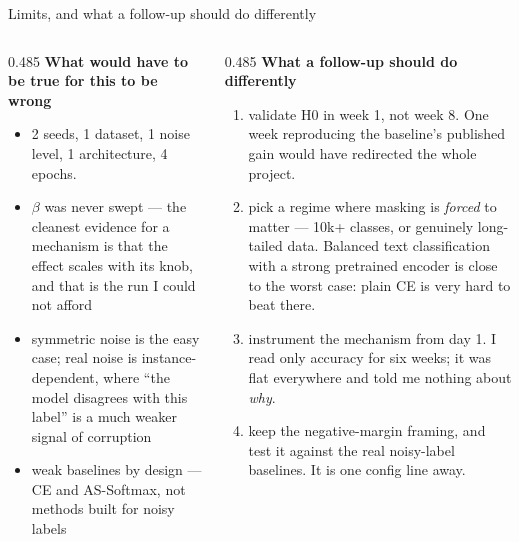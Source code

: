 \begin{frame}{Limits, and what a follow-up should do differently}
  \scriptsize
  \begin{columns}[T]
    \begin{column}{0.485\textwidth}
      \textbf{What would have to be true for this to be wrong}
      \begin{itemize}\setlength\itemsep{0.2em}
        \item 2 seeds, 1 dataset, 1 noise level, 1 architecture, 4 epochs.
        \item $\beta$ was never swept --- the cleanest evidence for a mechanism
              is that the effect scales with its knob, and that is the run I
              could not afford
        \item symmetric noise is the easy case; real noise is
              instance-dependent, where ``the model disagrees with this label''
              is a much weaker signal of corruption
        \item weak baselines by design --- CE and AS-Softmax, not methods built
              for noisy labels
      \end{itemize}
    \end{column}
    \begin{column}{0.485\textwidth}
      \textbf{What a follow-up should do differently}
      \begin{enumerate}\setlength\itemsep{0.2em}
        \item \alert{validate H0 in week 1}, not week 8. One week reproducing
              the baseline's published gain would have redirected the whole
              project.
        \item pick a regime where masking is \emph{forced} to matter --- 10k+
              classes, or genuinely long-tailed data. Balanced text
              classification with a strong pretrained encoder is close to the
              worst case: plain CE is very hard to beat there.
        \item instrument the mechanism from day 1. I read only accuracy for six
              weeks; it was flat everywhere and told me nothing about \emph{why}.
        \item keep the negative-margin framing, and test it against the real
              noisy-label baselines. It is one config line away.

\end{enumerate}
\end{column}
\end{columns}
\end{frame}
